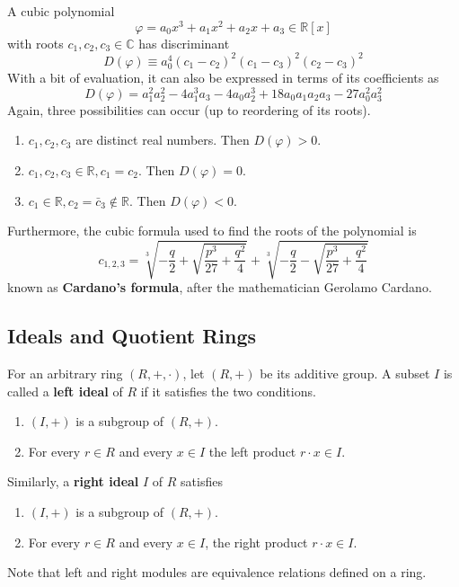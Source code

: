     \begin{lemma}
      A cubic polynomial 
      \begin{equation}
        \varphi = a_0 x^3 + a_1 x^2 + a_2 x + a_3 \in \mathbb{R}[x]
      \end{equation}
      with roots $c_1, c_2, c_3 \in \mathbb{C}$ has discriminant
      \begin{equation}
        D(\varphi) \equiv a_0^4 (c_1 - c_2)^2 (c_1 - c_3)^2 (c_2 - c_3)^2
      \end{equation}
      With a bit of evaluation, it can also be expressed in terms of its coefficients as
      \begin{equation}
        D(\varphi) = a_1^2 a_2^2 - 4a_1^3 a_3 - 4a_0 a_2^3 + 18 a_0 a_1 a_2 a_3 - 27 a_0^2 a_3^2
      \end{equation}
      Again, three possibilities can occur (up to reordering of its roots). 
      \begin{enumerate}
          \item $c_1, c_2, c_3$ are distinct real numbers. Then $D(\varphi) > 0$. 
          \item $c_1, c_2, c_3 \in \mathbb{R}, c_1 = c_2$. Then $D(\varphi) = 0$. 
          \item $c_1 \in \mathbb{R}, c_2 = \bar{c}_3 \not\in \mathbb{R}$. Then $D(\varphi) < 0$. 
      \end{enumerate}
      Furthermore, the cubic formula used to find the roots of the polynomial is 
      \begin{equation}
        c_{1, 2, 3} = \sqrt[3]{-\frac{q}{2} + \sqrt{\frac{p^3}{27} + \frac{q^2}{4}}} + \sqrt[3]{-\frac{q}{2} - \sqrt{\frac{p^3}{27} + \frac{q^2}{4}}}
      \end{equation}
      known as \textbf{Cardano's formula}, after the mathematician Gerolamo Cardano. 
    \end{lemma}

\subsection{Ideals and Quotient Rings}

  \begin{definition}
    For an arbitrary ring $(R,+, \cdot)$, let $(R, +)$ be its additive group. A subset $I$ is called a \textbf{left ideal} of $R$ if it satisfies the two conditions. 
    \begin{enumerate}
      \item $(I, +)$ is a subgroup of $(R, +)$. 
      \item For every $r \in R$ and every $x \in I$ the left product $r \cdot x \in I$. 
    \end{enumerate}
    Similarly, a \textbf{right ideal} $I$ of $R$ satisfies
    \begin{enumerate}
      \item $(I, +)$ is a subgroup of $(R, +)$. 
      \item For every $r \in R$ and every $x \in I$, the right product $r \cdot x \in I$. 
    \end{enumerate}
    Note that left and right modules are equivalence relations defined on a ring. 
  \end{definition}

